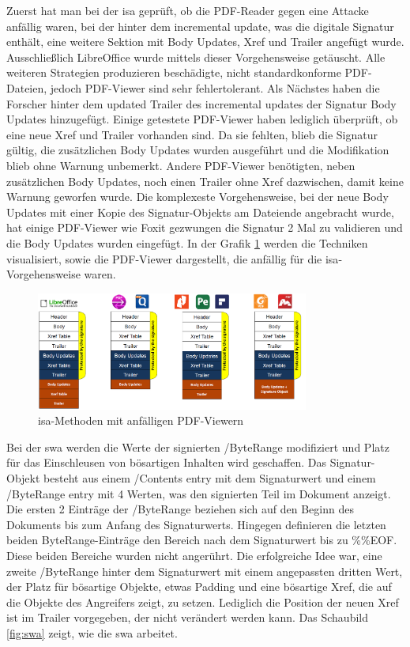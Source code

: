 Zuerst hat man bei der \gls{isa} geprüft, ob die PDF-Reader gegen eine Attacke anfällig waren, bei der hinter dem incremental update, was die digitale Signatur enthält, eine weitere Sektion mit Body Updates, Xref und Trailer angefügt wurde. Ausschließlich LibreOffice wurde mittels dieser Vorgehensweise getäuscht. Alle weiteren Strategien produzieren beschädigte, nicht standardkonforme PDF-Dateien, jedoch PDF-Viewer sind sehr fehlertolerant. Als Nächstes haben die Forscher hinter dem updated Trailer des incremental updates der Signatur Body Updates hinzugefügt. Einige getestete PDF-Viewer haben lediglich überprüft, ob eine neue Xref und Trailer vorhanden sind. Da sie fehlten, blieb die Signatur gültig, die zusätzlichen Body Updates wurden ausgeführt und die Modifikation blieb ohne Warnung unbemerkt. Andere PDF-Viewer benötigten, neben zusätzlichen Body Updates, noch einen Trailer ohne Xref dazwischen, damit keine Warnung geworfen wurde. Die komplexeste Vorgehensweise, bei der neue Body Updates mit einer Kopie des Signatur-Objekts am Dateiende angebracht wurde, hat einige PDF-Viewer wie Foxit gezwungen die Signatur 2 Mal zu validieren und die Body Updates wurden eingefügt. In der Grafik \ref{fig:isa} werden die Techniken visualisiert, sowie die PDF-Viewer dargestellt, die anfällig für die \gls{isa}-Vorgehensweise waren.

\begin{figure}[!htbp]
	\centering
	\includegraphics[width=0.8\textwidth]{"images/isa.png"}
	\caption{\gls{isa}-Methoden mit anfälligen PDF-Viewern \cite{ccc-break-pdf-slides}}
	\label{fig:isa}
\end{figure}

Bei der \gls{swa} werden die Werte der signierten /ByteRange modifiziert und Platz für das Einschleusen von bösartigen Inhalten wird geschaffen. Das Signatur-Objekt besteht aus einem /Contents entry mit dem Signaturwert und einem /ByteRange entry mit 4 Werten, was den signierten Teil im Dokument anzeigt. Die ersten 2 Einträge der /ByteRange beziehen sich auf den Beginn des Dokuments bis zum Anfang des Signaturwerts. Hingegen definieren die letzten beiden ByteRange-Einträge den Bereich nach dem Signaturwert bis zu \%\%EOF. Diese beiden Bereiche wurden nicht angerührt. Die erfolgreiche Idee war, eine zweite /ByteRange hinter dem Signaturwert mit einem angepassten dritten Wert, der Platz für bösartige Objekte, etwas Padding und eine bösartige Xref, die auf die Objekte des Angreifers zeigt, zu setzen. Lediglich die Position der neuen Xref ist im Trailer vorgegeben, der nicht verändert werden kann. Das Schaubild \ref{fig:swa} zeigt, wie die \gls{swa} arbeitet.

